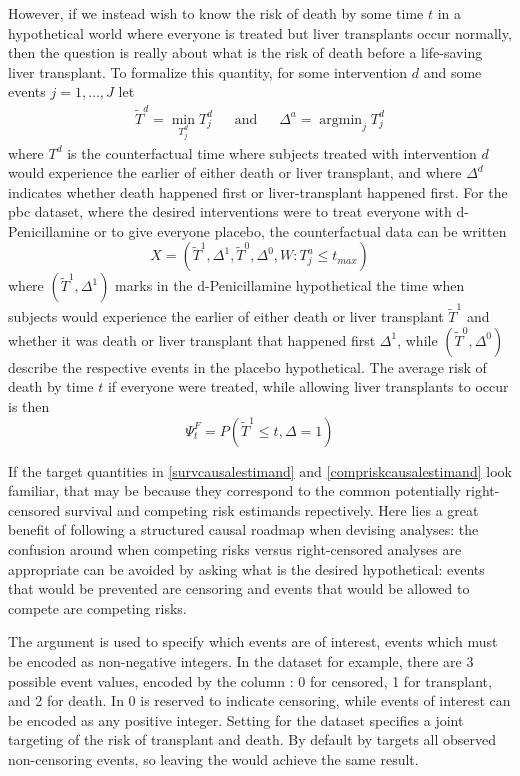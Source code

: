 \documentclass{report}
\DeclareMathOperator*{\argmin}{argmin}
\newcommand{\1}{\ensuremath{\mathbf{1}}}
\newcommand{\T}{\ensuremath{\widetilde{T}}}
\renewcommand{\L}{\ensuremath{W}}
\begin{document}
\begin{enumerate}
However, if we instead wish to know the risk of death by some time \(t\) in a hypothetical world where everyone is treated but liver transplants occur normally, then the question is really about what is the risk of death before a life-saving liver transplant. To formalize this quantity, for some intervention \(d\) and some events \(j = 1,\dots, J\) let
\begin{align*}
\T^d = \min_{T^d_j} T^d_j \;\;\quad \text{and} \quad \;\; \Delta^a = \argmin_{j} T^d_j
\end{align*}
where \(T^d\) is the counterfactual time where subjects treated with intervention \(d\) would experience the earlier of either death or liver transplant, and where \(\Delta^d\) indicates whether death happened first or liver-transplant happened first.
For the pbc dataset, where the desired interventions were to treat everyone with d-Penicillamine or to give everyone placebo, the counterfactual data can be written
\[ X = (\T^1, \Delta^1, \T^0, \Delta^0, \L : T^a_j \leq t_{max}) \]
where \((\T^1, \Delta^1)\) marks in the d-Penicillamine hypothetical the time when subjects would experience the earlier of either death or liver transplant \(\T^1\) and whether it was death or liver transplant that happened first \(\Delta^1\), while \((\T^0, \Delta^0)\) describe the respective events in the placebo hypothetical. The average risk of death by time \(t\) if everyone were treated, while allowing liver transplants to occur is then
\begin{equation*}
 \Psi^F_t = P(\T^1 \leq t, \Delta = 1)
 \label{compriskcausalestimand}
\end{equation*}

If the target quantities in \eqref{survcausalestimand} and \eqref{compriskcausalestimand} look familiar, that may be because they correspond to the common potentially right-censored survival and competing risk estimands repectively. Here lies a great benefit of following a structured causal roadmap when devising analyses: the confusion around when competing risks versus right-censored analyses are appropriate can be avoided by asking what is the desired hypothetical: events that would be prevented are censoring and events that would be allowed to compete are competing risks.

The  argument is used to specify which events are of interest, events which must be encoded as non-negative integers. In the  dataset for example, there are 3 possible event values, encoded by the   column : 0 for censored, 1 for transplant, and 2 for death. In  0 is reserved to indicate censoring, while events of interest can be encoded as any positive integer. Setting  for the  dataset specifies a joint targeting of the risk of transplant and death. By default  by targets all observed non-censoring events, so leaving the  would achieve the same result.


\end{enumerate}
\end{document}
